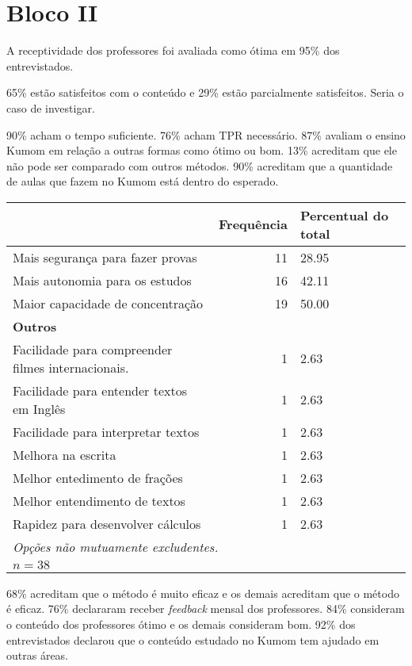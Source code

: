 \documentclass[a4paper, 12pt, openright, oneside, german, french, english, brazil, article]{abntex2}
\begin{document}
	
	\section{Bloco II}
	
	A receptividade dos professores foi avaliada como ótima em 95\% dos entrevistados.
	
	65\% estão satisfeitos com o conteúdo e 29\% estão parcialmente satisfeitos. Seria o caso de investigar.
	
	90\% acham o tempo suficiente. 76\% acham TPR necessário. 87\% avaliam o ensino Kumom em relação a outras formas como ótimo ou bom. 13\% acreditam que ele não pode ser comparado com outros métodos. 90\% acreditam que a quantidade de aulas que fazem no Kumom está dentro do esperado. 
	
	
	\begin{table}[ht]
		\ibgetab{
		\centering
	}
		{\begin{tabular}{p{7cm}rp{2cm}}
			\hline
			& Frequência & Percentual do total\\ 
			\hline
			Mais segurança para fazer provas &  11 & 28.95 \\
			Mais autonomia para os estudos &  16 & 42.11 \\
			Maior capacidade de concentração &  19 & 50.00 \\
			\textbf{Outros} & & \\
			Facilidade para compreender filmes internacionais. &   1 & 2.63 \\ 
			Facilidade para entender textos em Inglês  &   1 & 2.63 \\ 
			Facilidade para interpretar textos &   1 & 2.63 \\ 
			Melhora na escrita &   1 & 2.63 \\ 
			Melhor entedimento de frações &   1 & 2.63 \\ 
			Melhor entendimento de textos &   1 & 2.63 \\ 
			Rapidez para desenvolver cálculos &   1 & 2.63 \\ 

			\hline
			\multicolumn{3}{l}{\textit{Opções não mutuamente excludentes.}}\\
			\multicolumn{3}{l}{$n = 38$} \\
		\end{tabular}
	}
	{}
	\end{table}
	
	
	68\% acreditam que o método é muito eficaz e os demais acreditam que o método é eficaz. 76\% declararam receber \textit{feedback} mensal dos professores. 84\% consideram o conteúdo dos professores ótimo e os demais consideram bom. 92\% dos entrevistados declarou que o conteúdo estudado no Kumom tem ajudado em outras áreas. 
	
	
	
	
	
	
	
	
	
	
	
	
\end{document}

